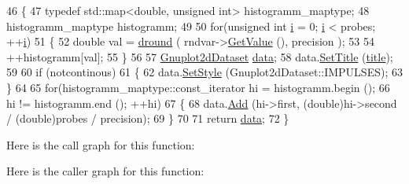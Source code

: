 \begin{DoxyCode}
46 \{
47   \textcolor{keyword}{typedef} std::map<double, unsigned int> histogramm\_maptype;
48   histogramm\_maptype histogramm;
49 
50   \textcolor{keywordflow}{for}(\textcolor{keywordtype}{unsigned} \textcolor{keywordtype}{int} \hyperlink{bernuolliDistribution_8m_a6f6ccfcf58b31cb6412107d9d5281426}{i} = 0; \hyperlink{bernuolliDistribution_8m_a6f6ccfcf58b31cb6412107d9d5281426}{i} < probes; ++\hyperlink{bernuolliDistribution_8m_a6f6ccfcf58b31cb6412107d9d5281426}{i})
51     \{
52       \textcolor{keywordtype}{double} val = \hyperlink{main-random-variable-stream_8cc_a03c6ffa77bf73ef1606f168290f71948}{dround} ( rndvar->\hyperlink{classns3_1_1RandomVariableStream_a4fa5944dc4cb11544e661ed23072b36c}{GetValue} (), precision );
53 
54       ++histogramm[val];
55     \}
56 
57   \hyperlink{classns3_1_1Gnuplot2dDataset}{Gnuplot2dDataset} \hyperlink{topology-example-sim_8cc_a26c65296e316af77b787dc77469bb2a4}{data};
58   data.\hyperlink{classns3_1_1GnuplotDataset_add68db1296fcadff7255633c0df96e08}{SetTitle} (\hyperlink{lte__link__budget_8m_a5b09b57ee35b13a452f0c089c0709f8b}{title});
59 
60   \textcolor{keywordflow}{if} (notcontinous)
61     \{
62       data.\hyperlink{classns3_1_1Gnuplot2dDataset_a7a3d6b6c2bd7d32a82f5715bae37c886}{SetStyle} (Gnuplot2dDataset::IMPULSES);
63     \}
64 
65   \textcolor{keywordflow}{for}(histogramm\_maptype::const\_iterator hi = histogramm.begin ();
66       hi != histogramm.end (); ++hi)
67     \{
68       data.\hyperlink{classns3_1_1Gnuplot2dDataset_abd93f7c8fa2d1ed643c09d7fb8d5ef27}{Add} (hi->first, (\textcolor{keywordtype}{double})hi->second / (\textcolor{keywordtype}{double})probes / precision);
69     \}
70 
71   \textcolor{keywordflow}{return} \hyperlink{topology-example-sim_8cc_a26c65296e316af77b787dc77469bb2a4}{data};
72 \}
\end{DoxyCode}


Here is the call graph for this function\+:




Here is the caller graph for this function\+:


